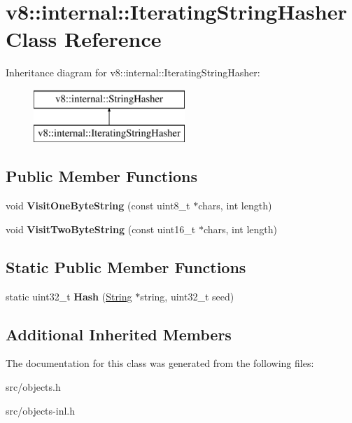 \hypertarget{classv8_1_1internal_1_1_iterating_string_hasher}{}\section{v8\+:\+:internal\+:\+:Iterating\+String\+Hasher Class Reference}
\label{classv8_1_1internal_1_1_iterating_string_hasher}
Inheritance diagram for v8\+:\+:internal\+:\+:Iterating\+String\+Hasher\+:\begin{figure}[H]
\begin{center}
\leavevmode
\includegraphics[height=2.000000cm]{classv8_1_1internal_1_1_iterating_string_hasher}
\end{center}
\end{figure}
\subsection*{Public Member Functions}
\begin{DoxyCompactItemize}
\item 
\hypertarget{classv8_1_1internal_1_1_iterating_string_hasher_a7be677eeced4b534a8f4b19a68fae449}{}void {\bfseries Visit\+One\+Byte\+String} (const uint8\+\_\+t $\ast$chars, int length)\label{classv8_1_1internal_1_1_iterating_string_hasher_a7be677eeced4b534a8f4b19a68fae449}

\item 
\hypertarget{classv8_1_1internal_1_1_iterating_string_hasher_a77569d7793ecc1e6c6b5a7286f96857d}{}void {\bfseries Visit\+Two\+Byte\+String} (const uint16\+\_\+t $\ast$chars, int length)\label{classv8_1_1internal_1_1_iterating_string_hasher_a77569d7793ecc1e6c6b5a7286f96857d}

\end{DoxyCompactItemize}
\subsection*{Static Public Member Functions}
\begin{DoxyCompactItemize}
\item 
\hypertarget{classv8_1_1internal_1_1_iterating_string_hasher_ad00dd25dd53b39583342e52494c251ae}{}static uint32\+\_\+t {\bfseries Hash} (\hyperlink{classv8_1_1internal_1_1_string}{String} $\ast$string, uint32\+\_\+t seed)\label{classv8_1_1internal_1_1_iterating_string_hasher_ad00dd25dd53b39583342e52494c251ae}

\end{DoxyCompactItemize}
\subsection*{Additional Inherited Members}


The documentation for this class was generated from the following files\+:\begin{DoxyCompactItemize}
\item 
src/objects.\+h\item 
src/objects-\/inl.\+h\end{DoxyCompactItemize}
